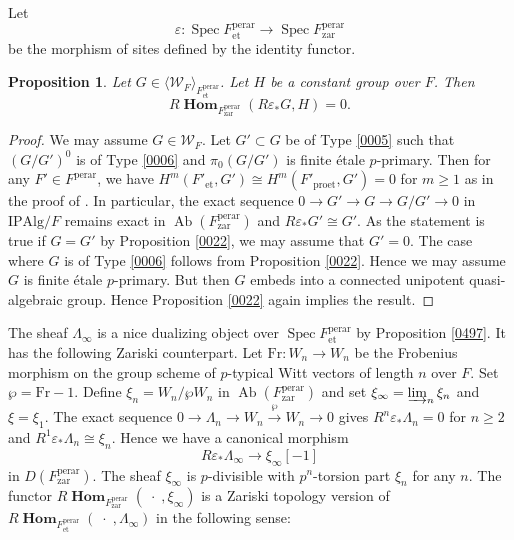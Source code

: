 \documentclass{amsart}
\newtheorem{Prop}[Thm]{Proposition}
\theoremstyle{remark}
\numberwithin{equation}{subsection}
\newcommand{\et}{\mathrm{et}}
\newcommand{\zar}{\mathrm{zar}}
\newcommand{\dirlim}{\varinjlim}
\newcommand{\pro}{\mathrm{pro}}
\newcommand{\perar}{\mathrm{perar}}
\newcommand{\Alg}{\mathrm{Alg}}
\newcommand{\Ind}{\mathrm{I}}
\newcommand{\Pro}{\mathrm{P}}
\newcommand{\alg}[1]{\mathbf{#1}}
\newcommand{\var}{\;\cdot\;}
\newcommand{\Frob}{\mathrm{Fr}}
\newcommand{\genby}[1]{\langle #1 \rangle}
\DeclareMathOperator{\Spec}{Spec}
\DeclareMathOperator{\Ab}{Ab}
\DeclareMathOperator{\sheafhom}{\alg{Hom}}
\begin{document}
Let 
	\[
			\varepsilon
		\colon
			\Spec F^{\perar}_{\et}
		\to
			\Spec F^{\perar}_{\zar}
	\]
be the morphism of sites defined by the identity functor.

\begin{Prop} \label{0023}
	Let $G \in \genby{\mathcal{W}_{F}}_{F^{\perar}_{\et}}$.
	Let $H$ be a constant group over $F$.
	Then
		\[
			R \sheafhom_{F^{\perar}_{\zar}}(R \varepsilon_{\ast} G, H) = 0.
		\]
\end{Prop}

\begin{proof}
	We may assume $G \in \mathcal{W}_{F}$.
	Let $G' \subset G$ be of Type \eqref{0005}
	such that $(G / G')^{0}$ is of Type \eqref{0006}
	and $\pi_{0}(G / G')$ is finite \'etale $p$-primary.
	Then for any $F' \in F^{\perar}$,
	we have $H^{m}(F'_{\et}, G') \cong H^{m}(F'_{\pro\et}, G') = 0$ for $m \ge 1$
	as in the proof of \cite[Proposition 2.4.2 (b)]{Suz20}.
	In particular, the exact sequence
	$0 \to G' \to G \to G / G' \to 0$ in $\Ind \Pro \Alg / F$
	remains exact in $\Ab(F^{\perar}_{\zar})$
	and $R \varepsilon_{\ast} G' \cong G'$.
	As the statement is true if $G = G'$ by
	Proposition \ref{0022},
	we may assume that $G' = 0$.
	The case where $G$ is of Type \eqref{0006}
	follows from Proposition \ref{0022}.
	Hence we may assume $G$ is finite \'etale $p$-primary.
	But then $G$ embeds into a connected unipotent quasi-algebraic group.
	Hence Proposition \ref{0022}
	again implies the result.
\end{proof}

The sheaf $\Lambda_{\infty}$ is a nice dualizing object over $\Spec F^{\perar}_{\et}$
by Proposition \ref{0497}.
It has the following Zariski counterpart.
Let $\Frob \colon W_{n} \to W_{n}$ be the Frobenius morphism
on the group scheme of $p$-typical Witt vectors of length $n$ over $F$.
Set $\wp = \Frob - 1$.
Define $\xi_{n} = W_{n} / \wp W_{n}$ in $\Ab(F^{\perar}_{\zar})$
and set $\xi_{\infty} = \dirlim_{n} \xi_{n}$ and $\xi = \xi_{1}$.
The exact sequence $0 \to \Lambda_{n} \to W_{n} \stackrel{\wp}{\to} W_{n} \to 0$
gives $R^{n} \varepsilon_{\ast} \Lambda_{n} = 0$ for $n \ge 2$
and $R^{1} \varepsilon_{\ast} \Lambda_{n} \cong \xi_{n}$.
Hence we have a canonical morphism
	\begin{equation} \label{0024}
			R \varepsilon_{\ast} \Lambda_{\infty}
		\to
			\xi_{\infty}[-1]
	\end{equation}
in $D(F^{\perar}_{\zar})$.
The sheaf $\xi_{\infty}$ is $p$-divisible with $p^{n}$-torsion part $\xi_{n}$ for any $n$.
The functor $R \sheafhom_{F^{\perar}_{\zar}}(\var, \xi_{\infty})$ is a Zariski topology version
of $R \sheafhom_{F^{\perar}_{\et}}(\var, \Lambda_{\infty})$
in the following sense:
\end{document}
